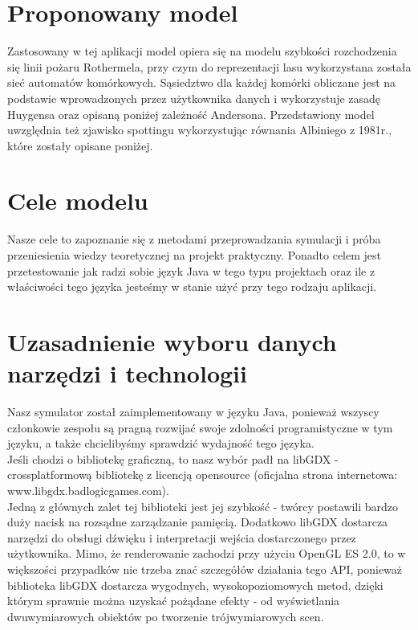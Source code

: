 \documentclass[a4paper, 11pt]{article}
\begin{document}
	\section{Proponowany model}
	\indent
	
	Zastosowany w tej aplikacji model opiera się na modelu szybkości rozchodzenia się linii pożaru Rothermela, przy czym do reprezentacji lasu wykorzystana została sieć automatów komórkowych. Sąsiedztwo dla każdej komórki obliczane jest na podstawie wprowadzonych przez użytkownika danych i wykorzystuje zasadę Huygensa oraz opisaną poniżej zależność Andersona. Przedstawiony model uwzględnia też zjawisko spottingu wykorzystując równania Albiniego z 1981r., które zostały opisane poniżej.\\
	
	\section*{Cele modelu}
	\indent
	
	Nasze cele to zapoznanie się z metodami przeprowadzania symulacji i próba przeniesienia wiedzy teoretycznej na projekt praktyczny. Ponadto celem jest przetestowanie jak radzi sobie język Java w tego typu projektach oraz ile z właściwości tego języka jesteśmy w stanie użyć przy tego rodzaju aplikacji.
	
	\section*{Uzasadnienie wyboru danych narzędzi i technologii}
	\indent
	
	Nasz symulator został zaimplementowany w języku Java, ponieważ wszyscy członkowie zespołu są pragną rozwijać swoje zdolności programistyczne w tym języku, a także chcielibyśmy sprawdzić wydajność tego języka.\\
	
	Jeśli chodzi o bibliotekę graficzną, to nasz wybór padł na libGDX - crossplatformową bibliotekę z licencją opensource (oficjalna strona internetowa: www.libgdx.badlogicgames.com). \\
	
	Jedną z głównych zalet tej biblioteki jest jej szybkość - twórcy postawili bardzo duży nacisk na rozsądne zarządzanie pamięcią.  Dodatkowo libGDX dostarcza narzędzi do obsługi dźwięku i interpretacji wejścia dostarczonego przez użytkownika. Mimo, że renderowanie zachodzi przy użyciu OpenGL ES 2.0, to w większości przypadków nie trzeba znać szczegółów działania tego API, ponieważ biblioteka libGDX dostarcza wygodnych, wysokopoziomowych metod, dzięki którym sprawnie można uzyskać pożądane efekty - od wyświetlania dwuwymiarowych obiektów po tworzenie trójwymiarowych scen.\\
	
\end{document}
